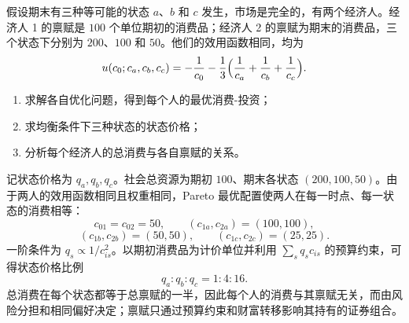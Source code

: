 \begin{problem}
 假设期末有三种等可能的状态 $a$、$b$ 和 $c$ 发生，市场是完全的，有两个经济人。经济人 1 的禀赋是 $100$ 个单位期初的消费品；经济人 2 的禀赋为期末的消费品，三个状态下分别为 $200$、$100$ 和 $50$。他们的效用函数相同，均为
\[
    u(c_0;c_a,c_b,c_c)=-\frac{1}{c_0}-\frac{1}{3}\Bigl(\frac{1}{c_a}+\frac{1}{c_b}+\frac{1}{c_c}\Bigr).
\]
\begin{enumerate}[label=(\alph*)]
    \item 求解各自优化问题，得到每个人的最优消费-投资；
    \item 求均衡条件下三种状态的状态价格；
    \item 分析每个经济人的总消费与各自禀赋的关系。
\end{enumerate}
\end{problem}
\begin{solution}
记状态价格为 $q_a,q_b,q_c$。社会总资源为期初 $100$、期末各状态 $(200,100,50)$。由于两人的效用函数相同且权重相同，Pareto 最优配置使两人在每一时点、每一状态的消费相等：
\[
c_{01}=c_{02}=50,\qquad (c_{1a},c_{2a})=(100,100),
\]
\[
(c_{1b},c_{2b})=(50,50),\qquad (c_{1c},c_{2c})=(25,25).
\]
一阶条件为 $q_s\propto 1/c_{is}^{2}$。以期初消费品为计价单位并利用 $\sum_s q_s c_{is}$ 的预算约束，可得状态价格比例
\[
q_a:q_b:q_c=1:4:16.
\]
总消费在每个状态都等于总禀赋的一半，因此每个人的消费与其禀赋无关，而由风险分担和相同偏好决定；禀赋只通过预算约束和财富转移影响其持有的证券组合。
\end{solution}
